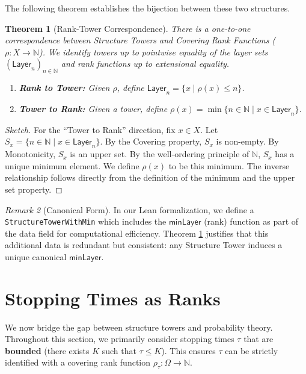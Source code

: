 \documentclass[11pt, a4paper]{article}
\newcommand{\layer}[1]{\mathsf{Layer}_{#1}}
\newcommand{\minLayer}{\mathsf{minLayer}}
\newcommand{\rank}{\rho}
\newcommand{\Nat}{\mathbb{N}}
\theoremstyle{plain}
\newtheorem{theorem}{Theorem}[section]
\theoremstyle{definition}
\theoremstyle{remark}
\newtheorem{remark}[theorem]{Remark}
\begin{document}
The following theorem establishes the bijection between these two structures.

\begin{theorem}[Rank-Tower Correspondence] \label{thm:rank_tower_corr}
There is a one-to-one correspondence between Structure Towers and Covering Rank Functions ($\rank: X \to \Nat$). We identify towers up to pointwise equality of the layer sets $(\layer{n})_{n \in \Nat}$ and rank functions up to extensional equality.
\begin{enumerate}
    \item \textbf{Rank to Tower:} Given $\rank$, define $\layer{n} = \{x \mid \rank(x) \le n\}$.
    \item \textbf{Tower to Rank:} Given a tower, define $\rank(x) = \min \{n \in \Nat \mid x \in \layer{n}\}$.
\end{enumerate}
\end{theorem}

\begin{proof}[Sketch]
For the ``Tower to Rank'' direction, fix $x \in X$. Let $S_x = \{n \in \Nat \mid x \in \layer{n}\}$. By the Covering property, $S_x$ is non-empty. By Monotonicity, $S_x$ is an upper set. By the well-ordering principle of $\Nat$, $S_x$ has a unique minimum element. We define $\rank(x)$ to be this minimum. The inverse relationship follows directly from the definition of the minimum and the upper set property.
\end{proof}

\begin{remark}[Canonical Form]
In our Lean formalization, we define a \texttt{StructureTowerWithMin} which includes the $\minLayer$ (rank) function as part of the data field for computational efficiency. Theorem \ref{thm:rank_tower_corr} justifies that this additional data is redundant but consistent: any Structure Tower induces a unique canonical $\minLayer$.
\end{remark}

\section{Stopping Times as Ranks} \label{sec:stopping_ranks}

We now bridge the gap between structure towers and probability theory.
Throughout this section, we primarily consider stopping times $\tau$ that are \textbf{bounded} (there exists $K$ such that $\tau \le K$). This ensures $\tau$ can be strictly identified with a covering rank function $\rank_\tau: \Omega \to \Nat$.
\end{document}
